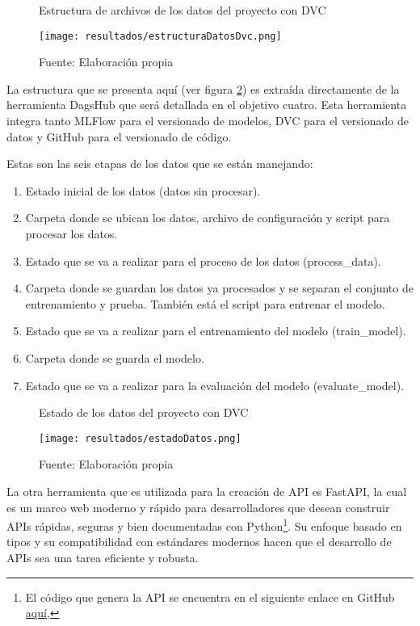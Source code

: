 \begin{figure}[h]
	\centering
	\caption{Estructura de archivos de los datos del proyecto con DVC}
	\texttt{[image: resultados/estructuraDatosDvc.png]}
	\caption*{\footnotesize Fuente: Elaboración propia}
	\label{fig:figuraEstructuraDatosDvc}
\end{figure}

La estructura que se presenta aquí (ver figura \ref{fig:figuraEstadoDatos}) es extraída directamente de la herramienta DagsHub que será detallada en el objetivo cuatro. Esta herramienta integra tanto MLFlow para el versionado de modelos, DVC para el versionado de datos y GitHub para el versionado de código.
\newline

Estas son las seis etapas de los datos que se están manejando:

\begin{enumerate}
	\item Estado inicial de los datos (datos sin procesar).
	\item Carpeta donde se ubican los datos, archivo de configuración y script para procesar los datos.
	\item Estado que se va a realizar para el proceso de los datos (process\_data).
	\item Carpeta donde se guardan los datos ya procesados y se separan el conjunto de entrenamiento y prueba. También está el script para entrenar el modelo.
	\item Estado que se va a realizar para el entrenamiento del modelo (train\_model).
	\item Carpeta donde se guarda el modelo.
	\item Estado que se va a realizar para la evaluación del modelo (evaluate\_model).
\end{enumerate}

\begin{figure}[h]
\centering
\caption{Estado de los datos del proyecto con DVC}
\texttt{[image: resultados/estadoDatos.png]}
\caption*{\footnotesize Fuente: Elaboración propia}
\label{fig:figuraEstadoDatos}
\end{figure}

La otra herramienta que es utilizada para la creación de API es FastAPI, la cual es un marco web moderno y rápido para desarrolladores que desean construir APIs rápidas, seguras y bien documentadas con Python\footnote{El código que genera la API se encuentra en el siguiente enlace en GitHub \href{https://github.com/juferoto/mlops_project/tree/master/application/src}{aquí},}. Su enfoque basado en tipos y su compatibilidad con estándares modernos hacen que el desarrollo de APIs sea una tarea eficiente y robusta.

